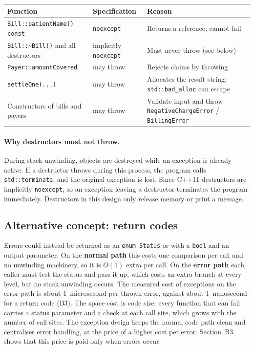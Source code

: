 \documentclass[11pt,a4paper]{article}
\begin{document}
\begin{table}[H]
\centering
\small
\begin{tabular}{@{}p{5.8cm}p{2.2cm}p{6.6cm}@{}}
\toprule
\textbf{Function} & \textbf{Specification} & \textbf{Reason} \\
\midrule
\texttt{Bill::patientName() const} & \texttt{noexcept} & Returns a reference; cannot fail \\
\texttt{Bill::\~{}Bill()} and all destructors & implicitly \texttt{noexcept} & Must never throw (see below) \\
\texttt{Payer::amountCovered} & may throw & Rejects claims by throwing \\
\texttt{settleOne(...)} & may throw & Allocates the result string; \texttt{std::bad\_alloc} can escape \\
Constructors of bills and payers & may throw & Validate input and throw \texttt{NegativeChargeError} / \texttt{BillingError} \\
\bottomrule
\end{tabular}
\end{table}

\paragraph{Why destructors must not throw.} During stack unwinding, objects are destroyed while an exception is already active. If a destructor throws during this process, the program calls \texttt{std::terminate}, and the original exception is lost. Since C++11 destructors are implicitly \texttt{noexcept}, so an exception leaving a destructor terminates the program immediately. Destructors in this design only release memory or print a message.

\subsection*{Alternative concept: return codes}
Errors could instead be returned as an \texttt{enum Status} or with a \texttt{bool} and an output parameter. On the \textbf{normal path} this costs one comparison per call and no unwinding machinery, so it is $O(1)$ extra per call. On the \textbf{error path} each caller must test the status and pass it up, which costs an extra branch at every level, but no stack unwinding occurs. The measured cost of exceptions on the error path is about 1~microsecond per thrown error, against about 1~nanosecond for a return code (B3). The space cost is code size: every function that can fail carries a status parameter and a check at each call site, which grows with the number of call sites. The exception design keeps the normal code path clean and centralises error handling, at the price of a higher cost per error. Section~B3 shows that this price is paid only when errors occur.
\end{document}
